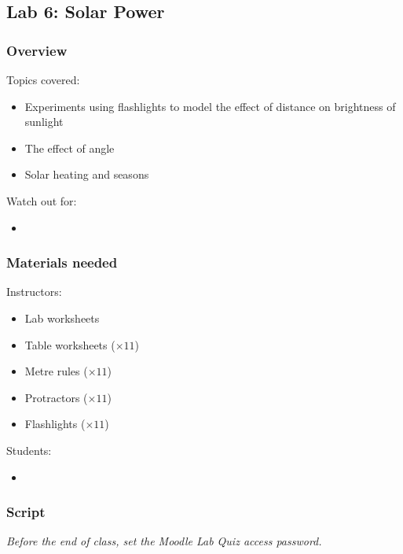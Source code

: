 \documentclass[12pt]{article}
\begin{document}
\newpage
\subsection{Lab 6: Solar Power}

\subsubsection{Overview}

Topics covered:
\begin{itemize}
\item Experiments using flashlights to model the effect of distance on brightness of sunlight
\item The effect of angle
\item Solar heating and seasons
\end{itemize}

\noindent
Watch out for:
\begin{itemize}
\item 
\end{itemize}


\subsubsection{Materials needed}

Instructors:
\begin{itemize}
\item Lab worksheets
\item Table worksheets ($\times 11$)
\item Metre rules ($\times 11$)
\item Protractors ($\times 11$)
\item Flashlights ($\times 11$)
\end{itemize}

\noindent
Students:
\begin{itemize}
\item 
\end{itemize}


\subsubsection{Script}


\emph{Before the end of class, set the Moodle Lab Quiz access password.}
\end{document}
